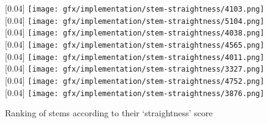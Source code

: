 \begin{figure}[h!]
{  }
  [0.04\linewidth]{
    \texttt{[image: gfx/implementation/stem-straightness/4103.png]}
  }
  [0.04\linewidth]{
    \texttt{[image: gfx/implementation/stem-straightness/5104.png]}
  }
  [0.04\linewidth]{
    \texttt{[image: gfx/implementation/stem-straightness/4038.png]}
  }
  [0.04\linewidth]{
    \texttt{[image: gfx/implementation/stem-straightness/4565.png]}
  }
  [0.04\linewidth]{
    \texttt{[image: gfx/implementation/stem-straightness/4011.png]}
  }
  [0.04\linewidth]{
    \texttt{[image: gfx/implementation/stem-straightness/3327.png]}
  }
  [0.04\linewidth]{
    \texttt{[image: gfx/implementation/stem-straightness/4752.png]}
  }
  [0.04\linewidth]{
    \texttt{[image: gfx/implementation/stem-straightness/3876.png]}
  }
  \caption{Ranking of stems according to their `straightness' score}
  \label{fig:stem-straightness-ranking}
\end{figure}
